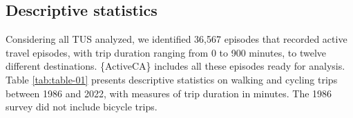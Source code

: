 \documentclass[Royal,times,sageh]{sagej}
\begin{document}
\begin{table}
\centering
\caption{\label{tab:gss-processed-file-2015}\label{tab:ep-2015-processed}Visualization of the active travel episode for the record number 10041 of the 2015 GSS survey.}
\centering
{}
\end{table}

\subsection{Descriptive statistics}\label{descriptive-statistics}

Considering all TUS analyzed, we identified 36,567 episodes that
recorded active travel episodes, with trip duration ranging from 0 to
900 minutes, to twelve different destinations. \{ActiveCA\} includes all
these episodes ready for analysis. Table \ref{tab:table-01} presents
descriptive statistics on walking and cycling trips between 1986 and
2022, with measures of trip duration in minutes. The 1986 survey did not
include bicycle trips.
\end{document}
